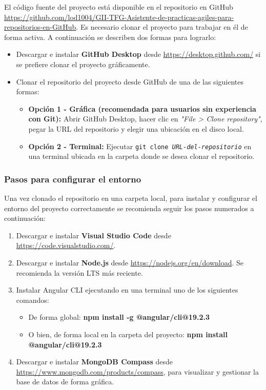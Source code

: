 El código fuente del proyecto está disponible en el repositorio en GitHub \url{https://github.com/lod1004/GII-TFG-Asistente-de-practicas-agiles-para-repositorios-en-GitHub}. Es necesario clonar el proyecto para trabajar en él de forma activa. A continuación se describen dos formas para lograrlo:

\begin{itemize}
    \item Descargar e instalar \textbf{GitHub Desktop} desde \url{https://desktop.github.com/} si se prefiere clonar el proyecto gráficamente.

	\item Clonar el repositorio del proyecto desde GitHub de una de las siguientes formas:
	\begin{itemize}
		\item \textbf{Opción 1 - Gráfica (recomendada para usuarios sin experiencia con Git):} Abrir GitHub Desktop, hacer clic en \textit{"File > Clone repository"}, pegar la URL del repositorio y elegir una ubicación en el disco local.
		\item \textbf{Opción 2 - Terminal:} Ejecutar \texttt{git clone \textit{URL-del-repositorio}} en una terminal ubicada en la carpeta donde se desea clonar el repositorio.
	\end{itemize}
\end{itemize}

\subsubsection{Pasos para configurar el entorno}

Una vez clonado el repositorio en una carpeta local, para instalar y configurar el entorno del proyecto correctamente se recomienda seguir los pasos numerados a continuación:

\begin{enumerate}

	\item Descargar e instalar \textbf{Visual Studio Code} desde \url{https://code.visualstudio.com/}.

	\item Descargar e instalar \textbf{Node.js} desde \url{https://nodejs.org/en/download}. Se recomienda la versión LTS más reciente.

	\item Instalar Angular CLI ejecutando en una terminal uno de los siguientes comandos:
	\begin{itemize}
		\item De forma global: \textbf{npm install -g @angular/cli@19.2.3}
		\item O bien, de forma local en la carpeta del proyecto: \textbf{npm install @angular/cli@19.2.3}
	\end{itemize}

    \item Descargar e instalar \textbf{MongoDB Compass} desde \url{https://www.mongodb.com/products/compass}, para visualizar y gestionar la base de datos de forma gráfica.

\end{enumerate}

